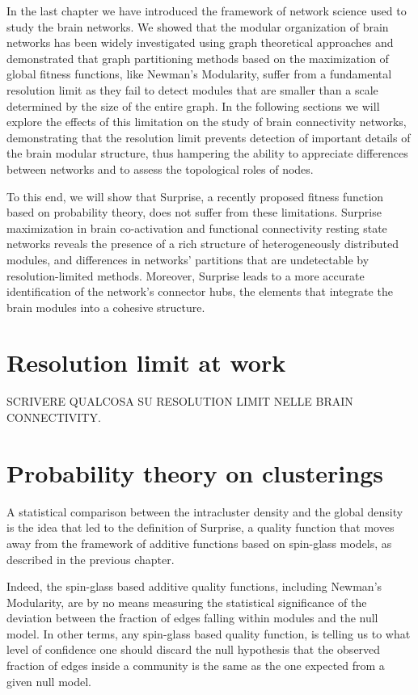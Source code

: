 
In the last chapter we have introduced the framework of network science used to study the brain networks. We showed that the modular organization of brain networks has been widely investigated using graph theoretical approaches and demonstrated that graph partitioning methods based on the maximization of global fitness functions, like Newman's Modularity, suffer from a fundamental resolution limit as they fail to detect modules that are smaller than a scale determined by the size of the entire graph.
In the following sections we will explore the effects of this limitation on the study of brain connectivity networks, demonstrating that the resolution limit prevents detection of important details of the brain modular structure, thus hampering the ability to appreciate differences between networks and to assess the topological roles of nodes.

To this end, we will show that Surprise, a recently proposed fitness function based on probability theory, does not suffer from these limitations.
Surprise maximization in brain co-activation and functional connectivity resting state networks reveals the presence of a rich structure of heterogeneously distributed modules, and differences in networks' partitions that are undetectable by resolution-limited methods.
Moreover, Surprise leads to a more accurate identification of the network's connector hubs, the elements that integrate the brain modules into a cohesive structure.

\section{Resolution limit at work}
SCRIVERE QUALCOSA SU RESOLUTION LIMIT NELLE BRAIN CONNECTIVITY.

\section{Probability theory on clusterings}\label{sec:probability_clustering}
A statistical comparison between the intracluster density and the global density is the idea that led to the definition of Surprise, a quality function that moves away from the framework of additive functions based on spin-glass models, as described in the previous chapter.

Indeed, the spin-glass based additive quality functions, including Newman's Modularity, are by no means measuring the statistical significance of the deviation between the fraction of edges falling within modules and the null model.
In other terms, any spin-glass based quality function, is telling us to what level of confidence one should discard the null hypothesis that the observed fraction of edges inside a community is the same as the one expected from a given null model.

